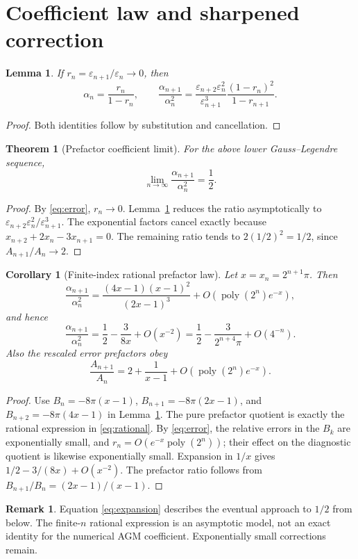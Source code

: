 \documentclass[11pt]{article}
\newtheorem{theorem}{Theorem}
\newtheorem{lemma}{Lemma}
\newtheorem{corollary}{Corollary}
\theoremstyle{definition}\newtheorem{remark}{Remark}\newtheorem{observation}{Numerical Observation}
\begin{document}
\section{Coefficient law and sharpened correction}
\begin{lemma}\label{lem:ratios}
If $r_n=\varepsilon_{n+1}/\varepsilon_n\to0$, then
\[
\alpha_n=\frac{r_n}{1-r_n},\qquad
\frac{\alpha_{n+1}}{\alpha_n^2}=
\frac{\varepsilon_{n+2}\varepsilon_n^2}{\varepsilon_{n+1}^3}
\frac{(1-r_n)^2}{1-r_{n+1}}.
\]
\end{lemma}
\begin{proof}Both identities follow by substitution and cancellation.\end{proof}
\begin{theorem}[Prefactor coefficient limit]\label{thm:limit}
For the above lower Gauss--Legendre sequence,
\[\lim_{n\to\infty}\frac{\alpha_{n+1}}{\alpha_n^2}=\frac12.\]
\end{theorem}
\begin{proof}
By \eqref{eq:error}, $r_n\to0$. Lemma~\ref{lem:ratios} reduces the ratio asymptotically to $\varepsilon_{n+2}\varepsilon_n^2/\varepsilon_{n+1}^3$. The exponential factors cancel exactly because $x_{n+2}+2x_n-3x_{n+1}=0$. The remaining ratio tends to $2(1/2)^2=1/2$, since $A_{n+1}/A_n\to2$.
\end{proof}
\begin{corollary}[Finite-index rational prefactor law]\label{cor:sharp}
Let $x=x_n=2^{n+1}\pi$. Then
\begin{equation}\label{eq:rational}
\frac{\alpha_{n+1}}{\alpha_n^2}
=\frac{(4x-1)(x-1)^2}{(2x-1)^3}
+O(\operatorname{poly}(2^n)e^{-x}),
\end{equation}
and hence
\begin{equation}\label{eq:expansion}
\frac{\alpha_{n+1}}{\alpha_n^2}
=\frac12-\frac{3}{8x}+O(x^{-2})
=\frac12-\frac{3}{2^{n+4}\pi}+O(4^{-n}).
\end{equation}
Also the rescaled error prefactors obey
\[
\frac{A_{n+1}}{A_n}=2+\frac1{x-1}+O(\operatorname{poly}(2^n)e^{-x}).
\]
\end{corollary}
\begin{proof}
Use $B_n=-8\pi(x-1)$, $B_{n+1}=-8\pi(2x-1)$, and $B_{n+2}=-8\pi(4x-1)$ in Lemma~\ref{lem:ratios}. The pure prefactor quotient is exactly the rational expression in \eqref{eq:rational}. By \eqref{eq:error}, the relative errors in the $B_k$ are exponentially small, and $r_n=O(e^{-x}\operatorname{poly}(2^n))$; their effect on the diagnostic quotient is likewise exponentially small. Expansion in $1/x$ gives $1/2-3/(8x)+O(x^{-2})$. The prefactor ratio follows from $B_{n+1}/B_n=(2x-1)/(x-1)$.
\end{proof}
\begin{remark}
Equation \eqref{eq:expansion} describes the eventual approach to $1/2$ from below. The finite-$n$ rational expression is an asymptotic model, not an exact identity for the numerical AGM coefficient. Exponentially small corrections remain.
\end{remark}
\end{document}
